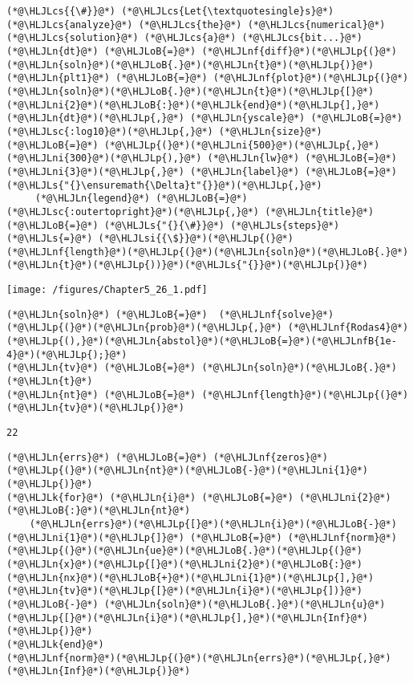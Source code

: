 \documentclass[12pt,a4paper]{article}
\newcommand{\HLJLk}[1]{\textcolor[RGB]{148,91,176}{\textbf{#1}}}
\newcommand{\HLJLn}[1]{#1}
\newcommand{\HLJLnf}[1]{\textcolor[RGB]{66,102,213}{#1}}
\newcommand{\HLJLs}[1]{\textcolor[RGB]{201,61,57}{#1}}
\newcommand{\HLJLsc}[1]{\textcolor[RGB]{201,61,57}{#1}}
\newcommand{\HLJLsi}[1]{#1}
\newcommand{\HLJLnfB}[1]{\textcolor[RGB]{59,151,46}{#1}}
\newcommand{\HLJLni}[1]{\textcolor[RGB]{59,151,46}{#1}}
\newcommand{\HLJLoB}[1]{\textcolor[RGB]{102,102,102}{\textbf{#1}}}
\newcommand{\HLJLp}[1]{#1}
\newcommand{\HLJLcs}[1]{\textcolor[RGB]{153,153,119}{\textit{#1}}}
\begin{document}
\begin{lstlisting}
(*@\HLJLcs{{\#}}@*) (*@\HLJLcs{Let{\textquotesingle}s}@*) (*@\HLJLcs{analyze}@*) (*@\HLJLcs{the}@*) (*@\HLJLcs{numerical}@*) (*@\HLJLcs{solution}@*) (*@\HLJLcs{a}@*) (*@\HLJLcs{bit...}@*)
(*@\HLJLn{dt}@*) (*@\HLJLoB{=}@*) (*@\HLJLnf{diff}@*)(*@\HLJLp{(}@*)(*@\HLJLn{soln}@*)(*@\HLJLoB{.}@*)(*@\HLJLn{t}@*)(*@\HLJLp{)}@*)
(*@\HLJLn{plt1}@*) (*@\HLJLoB{=}@*) (*@\HLJLnf{plot}@*)(*@\HLJLp{(}@*)(*@\HLJLn{soln}@*)(*@\HLJLoB{.}@*)(*@\HLJLn{t}@*)(*@\HLJLp{[}@*)(*@\HLJLni{2}@*)(*@\HLJLoB{:}@*)(*@\HLJLk{end}@*)(*@\HLJLp{],}@*) (*@\HLJLn{dt}@*)(*@\HLJLp{,}@*) (*@\HLJLn{yscale}@*) (*@\HLJLoB{=}@*) (*@\HLJLsc{:log10}@*)(*@\HLJLp{,}@*) (*@\HLJLn{size}@*) (*@\HLJLoB{=}@*) (*@\HLJLp{(}@*)(*@\HLJLni{500}@*)(*@\HLJLp{,}@*) (*@\HLJLni{300}@*)(*@\HLJLp{),}@*) (*@\HLJLn{lw}@*) (*@\HLJLoB{=}@*) (*@\HLJLni{3}@*)(*@\HLJLp{,}@*) (*@\HLJLn{label}@*) (*@\HLJLoB{=}@*) (*@\HLJLs{"{}\ensuremath{\Delta}t"{}}@*)(*@\HLJLp{,}@*) 
     (*@\HLJLn{legend}@*) (*@\HLJLoB{=}@*) (*@\HLJLsc{:outertopright}@*)(*@\HLJLp{,}@*) (*@\HLJLn{title}@*) (*@\HLJLoB{=}@*) (*@\HLJLs{"{}{\#}}@*) (*@\HLJLs{steps}@*) (*@\HLJLs{=}@*) (*@\HLJLsi{{\$}}@*)(*@\HLJLp{(}@*)(*@\HLJLnf{length}@*)(*@\HLJLp{(}@*)(*@\HLJLn{soln}@*)(*@\HLJLoB{.}@*)(*@\HLJLn{t}@*)(*@\HLJLp{))}@*)(*@\HLJLs{"{}}@*)(*@\HLJLp{)}@*)
\end{lstlisting}

\texttt{[image: /figures/Chapter5\_26\_1.pdf]}

\begin{lstlisting}
(*@\HLJLn{soln}@*) (*@\HLJLoB{=}@*)  (*@\HLJLnf{solve}@*)(*@\HLJLp{(}@*)(*@\HLJLn{prob}@*)(*@\HLJLp{,}@*) (*@\HLJLnf{Rodas4}@*)(*@\HLJLp{(),}@*)(*@\HLJLn{abstol}@*)(*@\HLJLoB{=}@*)(*@\HLJLnfB{1e-4}@*)(*@\HLJLp{);}@*)
(*@\HLJLn{tv}@*) (*@\HLJLoB{=}@*) (*@\HLJLn{soln}@*)(*@\HLJLoB{.}@*)(*@\HLJLn{t}@*)
(*@\HLJLn{nt}@*) (*@\HLJLoB{=}@*) (*@\HLJLnf{length}@*)(*@\HLJLp{(}@*)(*@\HLJLn{tv}@*)(*@\HLJLp{)}@*)
\end{lstlisting}

\begin{lstlisting}
22
\end{lstlisting}


\begin{lstlisting}
(*@\HLJLn{errs}@*) (*@\HLJLoB{=}@*) (*@\HLJLnf{zeros}@*)(*@\HLJLp{(}@*)(*@\HLJLn{nt}@*)(*@\HLJLoB{-}@*)(*@\HLJLni{1}@*)(*@\HLJLp{)}@*)
(*@\HLJLk{for}@*) (*@\HLJLn{i}@*) (*@\HLJLoB{=}@*) (*@\HLJLni{2}@*)(*@\HLJLoB{:}@*)(*@\HLJLn{nt}@*)
    (*@\HLJLn{errs}@*)(*@\HLJLp{[}@*)(*@\HLJLn{i}@*)(*@\HLJLoB{-}@*)(*@\HLJLni{1}@*)(*@\HLJLp{]}@*) (*@\HLJLoB{=}@*) (*@\HLJLnf{norm}@*)(*@\HLJLp{(}@*)(*@\HLJLn{ue}@*)(*@\HLJLoB{.}@*)(*@\HLJLp{(}@*)(*@\HLJLn{x}@*)(*@\HLJLp{[}@*)(*@\HLJLni{2}@*)(*@\HLJLoB{:}@*)(*@\HLJLn{nx}@*)(*@\HLJLoB{+}@*)(*@\HLJLni{1}@*)(*@\HLJLp{],}@*)(*@\HLJLn{tv}@*)(*@\HLJLp{[}@*)(*@\HLJLn{i}@*)(*@\HLJLp{])}@*) (*@\HLJLoB{-}@*) (*@\HLJLn{soln}@*)(*@\HLJLoB{.}@*)(*@\HLJLn{u}@*)(*@\HLJLp{[}@*)(*@\HLJLn{i}@*)(*@\HLJLp{],}@*)(*@\HLJLn{Inf}@*)(*@\HLJLp{)}@*)
(*@\HLJLk{end}@*)
(*@\HLJLnf{norm}@*)(*@\HLJLp{(}@*)(*@\HLJLn{errs}@*)(*@\HLJLp{,}@*)(*@\HLJLn{Inf}@*)(*@\HLJLp{)}@*)
\end{lstlisting}
\end{document}
